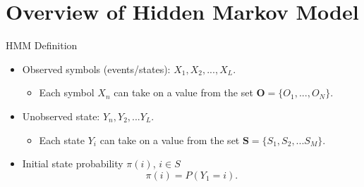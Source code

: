 \documentclass{beamer}
\begin{document}
\section{Overview of Hidden Markov Model}
\begin{frame}{HMM Definition}
	\begin{itemize}
		\item Observed symbols (events/states): $X_1, X_2, ..., X_L$.
		\begin{itemize}
			\item Each symbol $X_n$ can take on a value from the set $\textbf{O} = \{ O_1,..., O_N\}$.
		\end{itemize}
		\item Unobserved state: $Y_n, Y_2,...Y_L$.
		\begin{itemize}
			\item Each state $Y_i$ can take on a value from the set $\textbf{S} = \{S_1, S_2,...S_M\}$.
		\end{itemize}
		\item Initial state probability $\pi(i)$, $i \in S$
		\begin{equation}
			\pi(i) = P(Y_1 = i).
		\end{equation}
	\end{itemize}
\end{frame}
\end{document}
